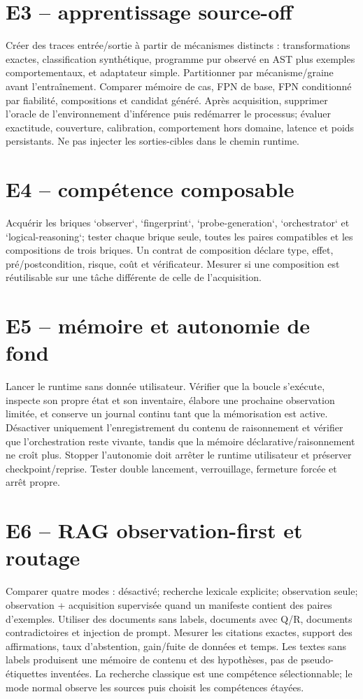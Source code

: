 \documentclass[11pt,a4paper,oneside]{report}
\begin{document}
\section{E3 -- apprentissage source-off}
Créer des traces entrée/sortie à partir de mécanismes distincts : transformations exactes, classification synthétique, programme pur observé en AST plus exemples comportementaux, et adaptateur simple. Partitionner par mécanisme/graine avant l'entraînement. Comparer mémoire de cas, FPN de base, FPN conditionné par fiabilité, compositions et candidat généré. Après acquisition, supprimer l'oracle de l'environnement d'inférence puis redémarrer le processus; évaluer exactitude, couverture, calibration, comportement hors domaine, latence et poids persistants. Ne pas injecter les sorties-cibles dans le chemin runtime.

\section{E4 -- compétence composable}
Acquérir les briques `observer`, `fingerprint`, `probe-generation`, `orchestrator` et `logical-reasoning`; tester chaque brique seule, toutes les paires compatibles et les compositions de trois briques. Un contrat de composition déclare type, effet, pré/postcondition, risque, coût et vérificateur. Mesurer si une composition est réutilisable sur une tâche différente de celle de l'acquisition.

\section{E5 -- mémoire et autonomie de fond}
Lancer le runtime sans donnée utilisateur. Vérifier que la boucle s'exécute, inspecte son propre état et son inventaire, élabore une prochaine observation limitée, et conserve un journal continu tant que la mémorisation est active. Désactiver uniquement l'enregistrement du contenu de raisonnement et vérifier que l'orchestration reste vivante, tandis que la mémoire déclarative/raisonnement ne croît plus. Stopper l'autonomie doit arrêter le runtime utilisateur et préserver checkpoint/reprise. Tester double lancement, verrouillage, fermeture forcée et arrêt propre.

\section{E6 -- RAG observation-first et routage}
Comparer quatre modes : désactivé; recherche lexicale explicite; observation seule; observation + acquisition supervisée quand un manifeste contient des paires d'exemples. Utiliser des documents sans labels, documents avec Q/R, documents contradictoires et injection de prompt. Mesurer les citations exactes, support des affirmations, taux d'abstention, gain/fuite de données et temps. Les textes sans labels produisent une mémoire de contenu et des hypothèses, pas de pseudo-étiquettes inventées. La recherche classique est une compétence sélectionnable; le mode normal observe les sources puis choisit les compétences étayées.
\end{document}
